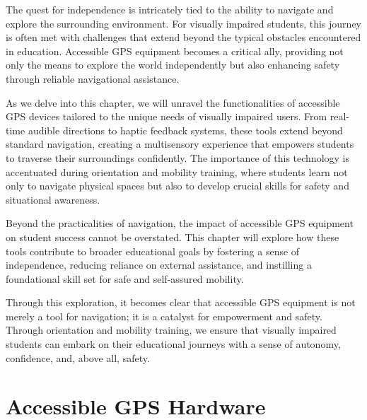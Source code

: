 \documentclass[14pt,letterpaper,twoside]{extreport}
\begin{document}
The quest for independence is intricately tied to the ability to navigate and explore the surrounding environment. For visually impaired students, this journey is often met with challenges that extend beyond the typical obstacles encountered in education. Accessible GPS equipment becomes a critical ally, providing not only the means to explore the world independently but also enhancing safety through reliable navigational assistance.

As we delve into this chapter, we will unravel the functionalities of accessible GPS devices tailored to the unique needs of visually impaired users. From real-time audible directions to haptic feedback systems, these tools extend beyond standard navigation, creating a multisensory experience that empowers students to traverse their surroundings confidently. The importance of this technology is accentuated during orientation and mobility training, where students learn not only to navigate physical spaces but also to develop crucial skills for safety and situational awareness.

Beyond the practicalities of navigation, the impact of accessible GPS equipment on student success cannot be overstated. This chapter will explore how these tools contribute to broader educational goals by fostering a sense of independence, reducing reliance on external assistance, and instilling a foundational skill set for safe and self-assured mobility.

Through this exploration, it becomes clear that accessible GPS equipment is not merely a tool for navigation; it is a catalyst for empowerment and safety. Through orientation and mobility training, we ensure that visually impaired students can embark on their educational journeys with a sense of autonomy, confidence, and, above all, safety.

\hypertarget{accessible-gps-mapping-hardware}{%
	\section{Accessible GPS Hardware}\label{accessible-gps-mapping-hardware}}
\end{document}
